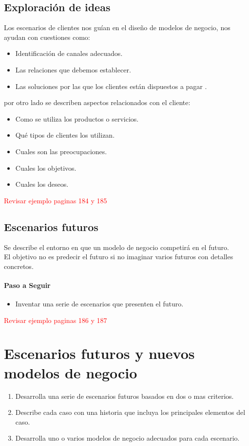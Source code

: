 \documentclass[11pt]{book}
\begin{document}
\subsection{Exploración de ideas}
Los escenarios de clientes nos guían en el diseño de modelos de negocio, nos ayudan con cuestiones como:
\begin{itemize}
\item Identificación de canales adecuados.
\item Las relaciones que debemos establecer.
\item Las soluciones por las que los clientes están dispuestos a pagar .
\end{itemize}
por otro lado se describen aspectos relacionados con el cliente:
\begin{itemize}
\item Como se utiliza los productos o servicios.
\item Qué tipos de clientes los utilizan. 
\item Cuales son las preocupaciones.
\item Cuales los objetivos.
\item Cuales los deseos.
\end{itemize}
\textcolor{red}{Revisar ejemplo paginas 184 y 185}
\subsection{Escenarios futuros}
Se describe el entorno en que un modelo de negocio competirá en el futuro.\\
El objetivo no es predecir el futuro si no imaginar varios futuros con detalles concretos.
\paragraph{Paso a Seguir}
\begin{itemize}
\item Inventar una serie de escenarios que presenten el futuro.
\end{itemize}
\textcolor{red}{Revisar ejemplo paginas 186 y 187}
\section{Escenarios futuros y nuevos modelos de negocio}
\begin{enumerate}
\item Desarrolla una serie de escenarios futuros basados en dos o mas criterios.
\item Describe cada caso con una historia que incluya los principales elementos del caso.
\item Desarrolla uno o varios modelos de negocio adecuados para cada escenario.
\end{enumerate}
\end{document}
